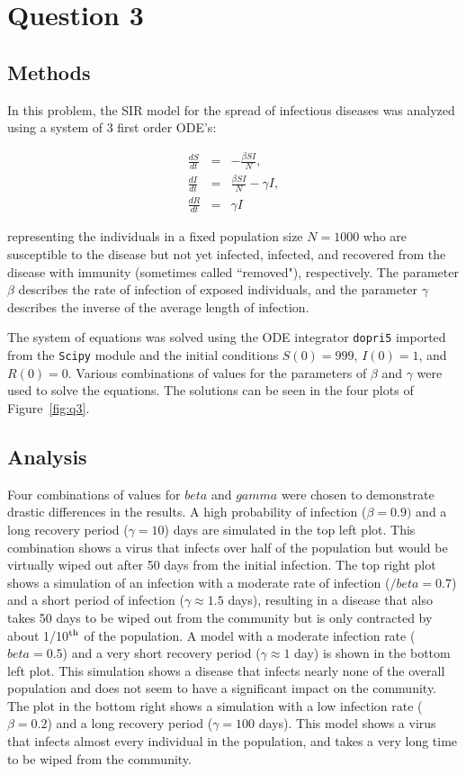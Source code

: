 \documentclass{article}
\begin{document}
\section{Question 3}

\subsection{Methods}
In this problem, the SIR model for the spread of infectious diseases was analyzed using a system of 3 first order ODE's:

\begin{eqnarray}
    \frac{dS}{dt} & = & -\frac{\beta S I}{N}, \\
    \label{eq:S}
    \frac{dI}{dt} & = & \frac{\beta S I}{N} - \gamma I, \\
    \label{eq:I}
    \frac{dR}{dt} & = & \gamma I
    \label{eq:R}
\end{eqnarray}

representing the individuals in a fixed population size $N=1000$ who are susceptible to the disease but not yet infected, infected, and recovered from the disease with immunity (sometimes called ``removed"), respectively.  The parameter $\beta$ describes the rate of infection of exposed individuals, and the parameter $\gamma$ describes the inverse of the average length of infection. 

The system of equations was solved using the ODE integrator {\tt dopri5} imported from the {\tt Scipy} module and the initial conditions $S(0)=999$, $I(0)=1$, and $R(0)=0$.  Various combinations of values for the parameters of $\beta$ and $\gamma$ were used to solve the equations.  The solutions can be seen in the four plots of Figure~\ref{fig:q3}.

\subsection{Analysis}
Four combinations of values for $beta$ and $gamma$ were chosen to demonstrate drastic differences in the results.  A high probability of infection ($\beta=0.9)$ and a long recovery period ($\gamma=10$) days are simulated in the top left plot.  This combination shows a virus that infects over half of the population but would be virtually wiped out after 50 days from the initial infection.  The top right plot shows a simulation of an infection with a moderate rate of infection ($/beta=0.7$) and a short period of infection ($\gamma \approx 1.5$ days), resulting in a disease that also takes 50 days to be wiped out from the community but is only contracted by about 1/10$^{\rm{th}}$ of the population.  A model with a moderate infection rate ($beta=0.5$) and a very short recovery period ($\gamma \approx 1$ day) is shown in the bottom left plot.  This simulation shows a disease that infects nearly none of the overall population and does not seem to have a significant impact on the community.  The plot in the bottom right shows a simulation with a low infection rate ($\beta = 0.2$) and a long recovery period ($\gamma = 100$ days).  This model shows a virus that infects almost every individual in the population, and takes a very long time to be wiped from the community.  
\end{document}
